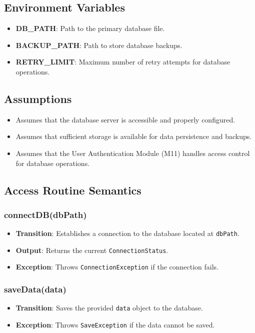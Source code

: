 \documentclass[12pt, titlepage]{article}
\begin{document}
\subsection{Environment Variables}
\begin{itemize}
    \item \textbf{DB\_PATH}: Path to the primary database file.
    \item \textbf{BACKUP\_PATH}: Path to store database backups.
    \item \textbf{RETRY\_LIMIT}: Maximum number of retry attempts for database operations.
\end{itemize}

\subsection{Assumptions}
\begin{itemize}
    \item Assumes that the database server is accessible and properly configured.
    \item Assumes that sufficient storage is available for data persistence and backups.
    \item Assumes that the User Authentication Module (M11) handles access control for database operations.
\end{itemize}

\subsection{Access Routine Semantics}

\subsubsection{connectDB(dbPath)}
\begin{itemize}
    \item \textbf{Transition}: Establishes a connection to the database located at \texttt{dbPath}.
    \item \textbf{Output}: Returns the current \texttt{ConnectionStatus}.
    \item \textbf{Exception}: Throws \texttt{ConnectionException} if the connection fails.
\end{itemize}

\subsubsection{saveData(data)}
\begin{itemize}
    \item \textbf{Transition}: Saves the provided \texttt{data} object to the database.
    \item \textbf{Exception}: Throws \texttt{SaveException} if the data cannot be saved.
\end{itemize}
\end{document}

